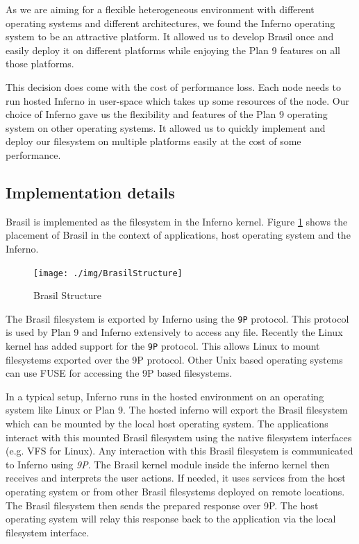 \documentclass[conference]{sig-alternate}
\begin{document}
As we are aiming for a flexible heterogeneous environment with different
operating systems and different architectures, we found the Inferno operating
system to be an attractive platform.  It allowed us to develop Brasil once and
easily deploy it on different platforms while enjoying the Plan 9 features
on all those platforms.

This decision does come with the cost of performance loss.  Each node needs
to run hosted Inferno in user-space which takes up some resources of the node. 
Our choice of Inferno gave us the flexibility and features of the Plan 9
operating system on other operating systems.  It allowed us to quickly
implement and deploy our filesystem on multiple platforms easily at the cost
of some performance.

\subsection{Implementation details}

Brasil is implemented as the filesystem in the Inferno kernel.  Figure 
\ref{fig:Brasil} shows the placement of Brasil in the context of applications,
host operating system and the Inferno.

\begin{figure}[h]
  \begin{center}
    \leavevmode
      \texttt{[image: ./img/BrasilStructure]}
    \caption{Brasil Structure}
    \label{fig:Brasil}
  \end{center}
\end{figure}

The Brasil filesystem is exported by Inferno using the \texttt{9P} protocol. 
This protocol is used by Plan 9 and Inferno extensively to access any file. 
Recently the Linux kernel has added support for the \texttt{9P}
protocol\cite{graverobbers}.  This allows Linux to mount filesystems
exported over the 9P protocol.  Other Unix based operating systems can use
FUSE\cite{FUSE} for accessing the 9P based filesystems. 

In a typical setup, Inferno runs in the hosted environment on an operating
system like Linux or Plan 9.  The hosted inferno will export the Brasil
filesystem which can be mounted by the local host operating system. The 
applications interact with this mounted Brasil filesystem using the native
filesystem interfaces (e.g. VFS for Linux). Any interaction with this Brasil
filesystem is communicated to Inferno using \textit{9P}. The Brasil kernel module
inside the inferno kernel then receives and interprets the user actions.  If
needed, it uses services from the host operating system or from other Brasil
filesystems deployed on remote locations.  The Brasil filesystem then sends the
prepared response over 9P. The host operating system will relay this response
back to the application via the local filesystem interface.
\end{document}
